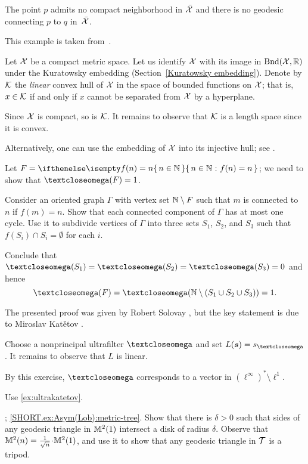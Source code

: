 The point $p$ admits no compact neighborhood in $\bar{\mathcal{X}}$ 
and there is no geodesic connecting $p$ to $q$ in~$\bar{\mathcal{X}}$.

 This example is taken from~\cite{bridson-haefliger}.

Let $\mathcal{X}$ be a compact metric space.
Let us identify $\mathcal{X}$ with its image in $\mathrm{Bnd}(\mathcal{X},\mathbb{R})$ under the Kuratowsky embedding (Section~\ref{Kuratowsky embedding}). 
Denote by $\mathcal{K}$ the \textit{linear} convex hull of $\mathcal{X}$ in the space of bounded functions on $\mathcal{X}$; 
that is, $x\in \spc{K}$ if and only if $x$ cannot be separated from $\mathcal{X}$ by a hyperplane.

Since $\mathcal{X}$ is compact, so is $\mathcal{K}$.
It remains to observe that $\mathcal{K}$ is a length space since it is convex.

Alternatively, one can use the embedding of $\mathcal{X}$ into its injective hull; see \cite{isbell}.

Let $F=\set{n\in \NN}{f(n)=n}$; we need to show that $\o(F)=1$.

Consider an oriented graph $\Gamma$ with vertex set $\mathbb{N}\setminus F$ such that $m$ is connected to $n$ if $f(m)=n$.
Show that each connected component of $\Gamma$ has at most one cycle.
Use it to subdivide vertices of $\Gamma$ into three sets $S_1$, $S_2$, and $S_3$ such that $f(S_i)\cap S_i=\emptyset$ for each $i$.

Conclude that $\o(S_1)=\o(S_2)=\o(S_3)=0$ and hence \[\o(F)=\o(\NN\setminus(S_1\cup S_2\cup S_3))=1.\]

The presented proof was given by Robert Solovay \cite{solovay}, but
the key statement is due to Miroslav Katětov \cite{katetov}.

Choose a nonprincipal ultrafilter $\o$ and set $L(\bm{s})=s_\o$.
It remains to observe that $L$ is linear.

By this exercise, $\o$ corresponds to a vector in $(\ell^\infty)^*\setminus\ell^1$. 

Use \ref{ex:ultrakatetov}.

\parbf{\ref{ex:Asym(Lob)}}; \ref{SHORT.ex:Asym(Lob):metric-tree}.
Show that there is $\delta>0$ such that sides of any geodesic triangle in $\mathbb{M}_{{}}^{2}({1})$ intersect a disk of radius $\delta$.
Observe that $\Lob2n\z=\tfrac1{\sqrt{n}}\cdot\Lob21$, and use it to show that any geodesic triangle in $\mathcal{T}$ is a tripod.

